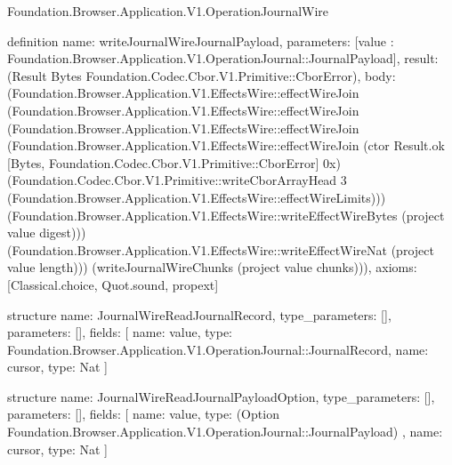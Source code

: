 \begin{lexlean}{Foundation.Browser.Application.V1.OperationJournalWire}
\begin{semanticmodule}
definition{
  name: writeJournalWireJournalPayload,
  parameters: [value : Foundation.Browser.Application.V1.OperationJournal::JournalPayload],
  result: (Result Bytes Foundation.Codec.Cbor.V1.Primitive::CborError),
  body: (Foundation.Browser.Application.V1.EffectsWire::effectWireJoin (Foundation.Browser.Application.V1.EffectsWire::effectWireJoin (Foundation.Browser.Application.V1.EffectsWire::effectWireJoin (Foundation.Browser.Application.V1.EffectsWire::effectWireJoin (ctor Result.ok [Bytes, Foundation.Codec.Cbor.V1.Primitive::CborError] 0x) (Foundation.Codec.Cbor.V1.Primitive::writeCborArrayHead 3 (Foundation.Browser.Application.V1.EffectsWire::effectWireLimits))) (Foundation.Browser.Application.V1.EffectsWire::writeEffectWireBytes (project value digest))) (Foundation.Browser.Application.V1.EffectsWire::writeEffectWireNat (project value length))) (writeJournalWireChunks (project value chunks))),
  axioms: [Classical.choice, Quot.sound, propext]
}

structure{
  name: JournalWireReadJournalRecord,
  type_parameters: [],
  parameters: [],
  fields: [
    {name: value, type: Foundation.Browser.Application.V1.OperationJournal::JournalRecord},
    {name: cursor, type: Nat}
  ]
}

structure{
  name: JournalWireReadJournalPayloadOption,
  type_parameters: [],
  parameters: [],
  fields: [
    {
      name: value,
      type: (Option Foundation.Browser.Application.V1.OperationJournal::JournalPayload)
    },
    {name: cursor, type: Nat}
  ]
}


\end{semanticmodule}
\end{lexlean}
